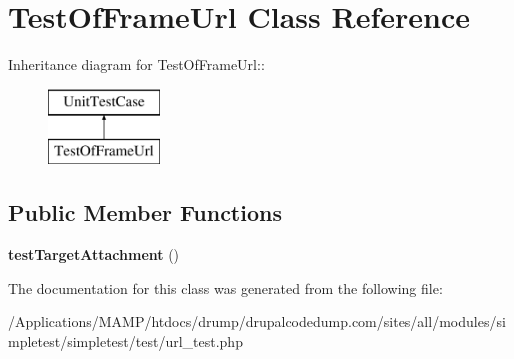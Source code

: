 \hypertarget{class_test_of_frame_url}{
\section{TestOfFrameUrl Class Reference}
\label{class_test_of_frame_url}
}
Inheritance diagram for TestOfFrameUrl::\begin{figure}[H]
\begin{center}
\leavevmode
\includegraphics[height=2cm]{class_test_of_frame_url}
\end{center}
\end{figure}
\subsection*{Public Member Functions}
\begin{DoxyCompactItemize}
\item 
\hypertarget{class_test_of_frame_url_af137416ba099f9bb0e95f48690f0a2fe}{
{\bfseries testTargetAttachment} ()}
\label{class_test_of_frame_url_af137416ba099f9bb0e95f48690f0a2fe}

\end{DoxyCompactItemize}


The documentation for this class was generated from the following file:\begin{DoxyCompactItemize}
\item 
/Applications/MAMP/htdocs/drump/drupalcodedump.com/sites/all/modules/simpletest/simpletest/test/url\_\-test.php\end{DoxyCompactItemize}
